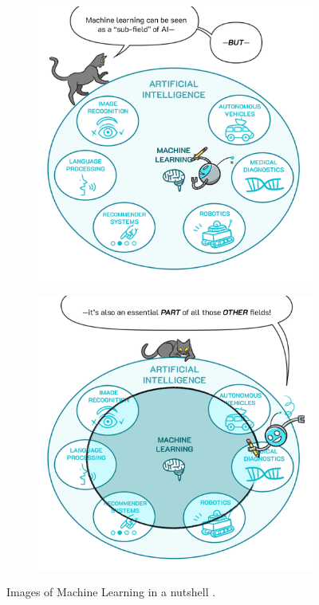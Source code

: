 \begin{figure}[h]
  \centering
  \begin{subfigure}[b]{0.45\textwidth}
    \centering
    \includegraphics[width=\textwidth]{images/ml-1.png}
    \label{fig:ml-1}
  \end{subfigure}
  \hfill
  \begin{subfigure}[b]{0.45\textwidth}
    \centering
    \includegraphics[width=\textwidth]{images/ml-2.png}
    \label{fig:ml-2}
  \end{subfigure}
  \caption{Images of Machine Learning in a nutshell \citep{google_comics_fact_ML}.}
  \label{fig:sidebyside}
\end{figure}

